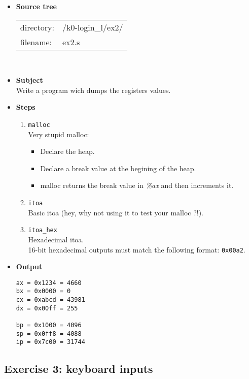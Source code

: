 {\begin{itemize}
\item {\bf Source tree}\\
\begin{tabular}{p{4cm}l}
directory: & /k0-login\_l/ex2/\\
filename: & ex2.s
\end{tabular}
\\
\item {\bf Subject}\\
Write a program wich dumps the registers values.\\
\item {\bf Steps}
  \begin{enumerate}
  \item {\tt malloc}\\
  Very stupid malloc:
  \begin{itemize}
  \item Declare the heap.
  \item Declare a break value at the begining of the heap.
  \item malloc returns the break value in {\em \%ax} and then increments it.
  \end{itemize}
  \item {\tt itoa}\\
  Basic itoa (hey, why not using it to test your malloc ?!).
  \item {\tt itoa\_hex}\\
  Hexadecimal itoa.\\
  16-bit hexadecimal outputs must match the following format: {\tt 0x00a2}.
\\
  \end{enumerate}
\item {\bf Output}
\begin{verbatim}
ax = 0x1234 = 4660
bx = 0x0000 = 0
cx = 0xabcd = 43981
dx = 0x00ff = 255

bp = 0x1000 = 4096
sp = 0x0ff8 = 4088
ip = 0x7c00 = 31744
\end{verbatim}

\end{itemize}

\newpage

\subsection*{Exercise 3: keyboard inputs}

}
